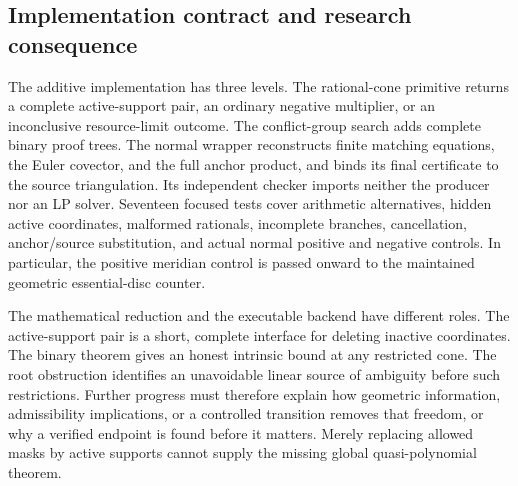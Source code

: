 \subsection{Implementation contract and research consequence}

The additive implementation has three levels.  The rational-cone primitive
returns a complete active-support pair, an ordinary negative multiplier, or
an inconclusive resource-limit outcome.  The conflict-group search adds
complete binary proof trees.  The normal wrapper reconstructs finite
matching equations, the Euler covector, and the full anchor product, and
binds its final certificate to the source triangulation.  Its independent
checker imports neither the producer nor an LP solver.  Seventeen focused
tests cover arithmetic alternatives, hidden active coordinates, malformed
rationals, incomplete branches, cancellation, anchor/source substitution,
and actual normal positive and negative controls.  In particular, the
positive meridian control is passed onward to the maintained geometric
essential-disc counter.

The mathematical reduction and the executable backend have different roles.
The active-support pair is a short, complete interface for deleting inactive
coordinates.  The binary theorem gives an honest intrinsic bound at any
restricted cone.  The root obstruction identifies an unavoidable linear
source of ambiguity before such restrictions.  Further progress must
therefore explain how geometric information, admissibility implications,
or a controlled transition removes that freedom, or why a verified endpoint
is found before it matters.  Merely replacing allowed masks by active
supports cannot supply the missing global quasi-polynomial theorem.
